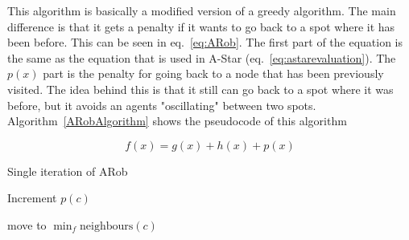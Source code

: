 This algorithm is basically a modified version of a greedy algorithm. The main difference is that it gets a penalty if it wants to go back to a spot where it has been before. This can be seen in eq.~\ref{eq:ARob}. The first part of the equation is the same as the equation that is used in A-Star (eq.~\ref{eq:astarevaluation}). The $p(x)$ part is the penalty for going back to a node that has been previously visited. The idea behind this is that it still can go back to a spot where it was before, but it avoids an agents "oscillating" between two spots. Algorithm~\ref{ARobAlgorithm} shows the pseudocode of this algorithm

\begin{equation}
	\label{eq:ARob}
 	f(x) = g(x) + h(x) + p(x)
\end{equation}


\begin{algorithm}
\label{ARobAlgorithm}
    \caption{Single iteration of ARob}
    Increment $p(c)$\;
    
    move to $\min_f \mathrm{neighbours}(c)$
\end{algorithm}

        
        
        
        
        
    
